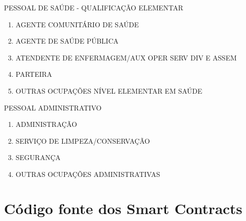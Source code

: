 \documentclass[a4paper,11pt]{article}
\begin{document}
PESSOAL DE SAÚDE - QUALIFICAÇÃO ELEMENTAR
\begin{enumerate}
    \item AGENTE COMUNITÁRIO DE SAÚDE
    \item AGENTE DE SAÚDE PÚBLICA
    \item ATENDENTE DE ENFERMAGEM/AUX OPER SERV DIV E ASSEM
    \item PARTEIRA
    \item OUTRAS OCUPAÇÕES NÍVEL ELEMENTAR EM SAÚDE
\end{enumerate}
PESSOAL ADMINISTRATIVO
\begin{enumerate}
    \item ADMINISTRAÇÃO
    \item SERVIÇO DE LIMPEZA/CONSERVAÇÃO
    \item SEGURANÇA
    \item OUTRAS OCUPAÇÕES ADMINISTRATIVAS
\end{enumerate}

\newpage
\section{Código fonte dos Smart Contracts}
\end{document}
